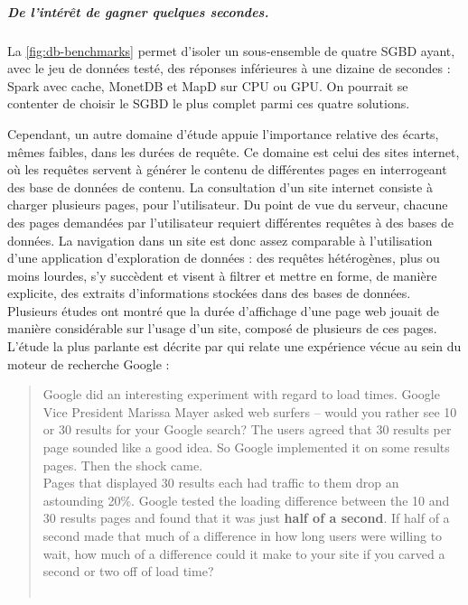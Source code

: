 \subparagraph{De l'intérêt de gagner quelques secondes.}

La \cref{fig:db-benchmarks} permet d'isoler un sous-ensemble de quatre SGBD ayant, avec le jeu de données testé, des réponses inférieures à une dizaine de secondes : Spark avec cache, MonetDB et MapD sur CPU ou GPU.
On pourrait se contenter de choisir le SGBD le plus complet parmi ces quatre solutions.

Cependant, un autre domaine d'étude appuie l'importance relative des écarts, mêmes faibles, dans les durées de requête.
Ce domaine est celui des sites internet, où les requêtes servent à générer le contenu de différentes pages en interrogeant des base de données de contenu.
La consultation d'un site internet consiste à charger plusieurs pages, pour l'utilisateur.
Du point de vue du serveur, chacune des pages demandées par l'utilisateur requiert différentes requêtes à des bases de données.
La navigation dans un site est donc assez comparable à l'utilisation d'une application d'exploration de données : des requêtes hétérogènes, plus ou moins lourdes, s'y succèdent et visent à filtrer et mettre en forme, de manière explicite, des extraits d'informations stockées dans des bases de données.
Plusieurs études ont montré que la durée d'affichage d'une page web jouait de manière considérable sur l'usage d'un site, composé de plusieurs de ces pages.
L'étude la plus parlante est décrite par  qui relate une expérience vécue au sein du moteur de recherche Google :

\begin{quotation}
	\noindent \og
	Google did an interesting experiment with regard to load times. Google Vice President Marissa Mayer asked web surfers – would you rather see 10 or 30 results for your Google search? The users agreed that 30 results per page sounded like a good idea. So Google implemented it on some results pages.
	Then the shock came.\\
	Pages that displayed 30 results each had traffic to them drop an astounding 20\%. Google tested the loading difference between the 10 and 30 results pages and found that it was just \textbf{half of a second}. If half of a second made that much of a difference in how long users were willing to wait, how much of a difference could it make to your site if you carved a second or two off of load time?
	\fg{}\\
	\mbox{}~ \hfill \autocite{patel_speed_2011}
\end{quotation}

